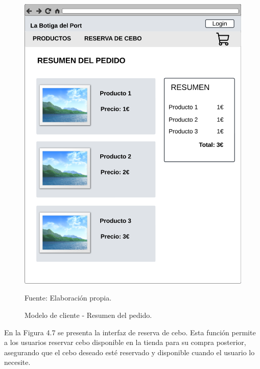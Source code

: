 \begin{figure}[H]
\begin{center}
\includegraphics[scale=0.5]{./Images/pedido.png}
\caption{Modelo de cliente - Resumen del pedido.} Fuente: Elaboración propia.

\label{fig:fig6}

\end{center}
\end{figure}

En la Figura 4.7 se presenta la interfaz de reserva de cebo. Esta función permite a los usuarios reservar cebo disponible en la tienda para su compra posterior, asegurando que el cebo deseado esté reservado y disponible cuando el usuario lo necesite.


